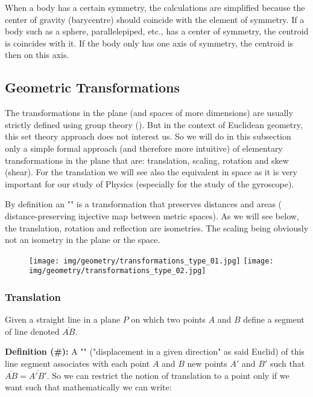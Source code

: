 	\begin{tcolorbox}[title=Remark,colframe=black,arc=10pt]
	When a body has a certain symmetry, the calculations are simplified because the center of gravity (barycentre) should coincide with the element of symmetry. If a body such as a sphere, parallelepiped, etc., has a center of symmetry, the centroid is coincides with it. If the body only has one axis of symmetry, the centroid is then on this axis.
	\end{tcolorbox}
	
	\subsection{Geometric Transformations}\label{geometric transformations}
	The transformations in the plane (and spaces of more dimensions) are usually strictly defined using group theory (). But in the context of Euclidean geometry, this set theory approach does not interest us. So we will do in this subsection only a simple formal approach (and therefore more intuitive) of elementary transformations in the plane that are: translation, scaling, rotation and skew (shear). For the translation we will see also the equivalent in space as it is very important for our study of Physics (especially for the study of the gyroscope).
	\begin{tcolorbox}[title=Remark,colframe=black,arc=10pt]
	By definition an "" is a transformation that preserves distances and areas ( distance-preserving injective map between metric spaces). As we will see below, the translation, rotation and reflection are isometries. The scaling being obviously not an isometry in the plane or the space.
	\end{tcolorbox}
	\begin{figure}[H]
		\centering
		\texttt{[image: img/geometry/transformations\_type\_01.jpg]}
		\texttt{[image: img/geometry/transformations\_type\_02.jpg]}
	\end{figure}
	
	\pagebreak
	\subsubsection{Translation}
	Given a straight line in a plane $P$ on which two points $A$ and $B$ define a segment of line denoted $\overline{AB}$.

	\textbf{Definition (\#\mydef):} A "" ("displacement in a given direction" as said Euclid) of this line segment associates with each point $A$ and $B$ new points $A'$ and $B'$ such that $\overline{AB}=\overline{A'B'}$. So we can restrict the notion of translation to a point only if we want such that mathematically we can write:
	
